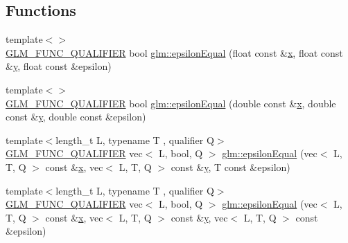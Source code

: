 \subsection*{Functions}
\begin{DoxyCompactItemize}
\item 
{\footnotesize template$<$$>$ }\\\mbox{\hyperlink{setup_8hpp_a33fdea6f91c5f834105f7415e2a64407}{G\+L\+M\+\_\+\+F\+U\+N\+C\+\_\+\+Q\+U\+A\+L\+I\+F\+I\+ER}} bool \mbox{\hyperlink{namespaceglm_aded5e7ea9a0eacd03367ad77986c2a15}{glm\+::epsilon\+Equal}} (float const \&\mbox{\hyperlink{_s_d_l__opengl_8h_ad0e63d0edcdbd3d79554076bf309fd47}{x}}, float const \&\mbox{\hyperlink{_s_d_l__opengl_8h_a1675d9d7bb68e1657ff028643b4037e3}{y}}, float const \&epsilon)
\item 
{\footnotesize template$<$$>$ }\\\mbox{\hyperlink{setup_8hpp_a33fdea6f91c5f834105f7415e2a64407}{G\+L\+M\+\_\+\+F\+U\+N\+C\+\_\+\+Q\+U\+A\+L\+I\+F\+I\+ER}} bool \mbox{\hyperlink{namespaceglm_a6e30ea38a0e3ebc25d87e667255057e5}{glm\+::epsilon\+Equal}} (double const \&\mbox{\hyperlink{_s_d_l__opengl_8h_ad0e63d0edcdbd3d79554076bf309fd47}{x}}, double const \&\mbox{\hyperlink{_s_d_l__opengl_8h_a1675d9d7bb68e1657ff028643b4037e3}{y}}, double const \&epsilon)
\item 
{\footnotesize template$<$length\+\_\+t L, typename T , qualifier Q$>$ }\\\mbox{\hyperlink{setup_8hpp_a33fdea6f91c5f834105f7415e2a64407}{G\+L\+M\+\_\+\+F\+U\+N\+C\+\_\+\+Q\+U\+A\+L\+I\+F\+I\+ER}} vec$<$ L, bool, Q $>$ \mbox{\hyperlink{group__gtc__epsilon_ga91b417866cafadd076004778217a1844}{glm\+::epsilon\+Equal}} (vec$<$ L, T, Q $>$ const \&\mbox{\hyperlink{_s_d_l__opengl_8h_ad0e63d0edcdbd3d79554076bf309fd47}{x}}, vec$<$ L, T, Q $>$ const \&\mbox{\hyperlink{_s_d_l__opengl_8h_a1675d9d7bb68e1657ff028643b4037e3}{y}}, T const \&epsilon)
\item 
{\footnotesize template$<$length\+\_\+t L, typename T , qualifier Q$>$ }\\\mbox{\hyperlink{setup_8hpp_a33fdea6f91c5f834105f7415e2a64407}{G\+L\+M\+\_\+\+F\+U\+N\+C\+\_\+\+Q\+U\+A\+L\+I\+F\+I\+ER}} vec$<$ L, bool, Q $>$ \mbox{\hyperlink{namespaceglm_a64e220eeafcda3b82fe986e3ce0eac03}{glm\+::epsilon\+Equal}} (vec$<$ L, T, Q $>$ const \&\mbox{\hyperlink{_s_d_l__opengl_8h_ad0e63d0edcdbd3d79554076bf309fd47}{x}}, vec$<$ L, T, Q $>$ const \&\mbox{\hyperlink{_s_d_l__opengl_8h_a1675d9d7bb68e1657ff028643b4037e3}{y}}, vec$<$ L, T, Q $>$ const \&epsilon)
\item 

\end{DoxyCompactItemize}
